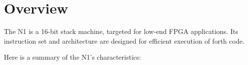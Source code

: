 
\section{Overview}
\label{overview}

The N1 is a 16-bit stack machine, targeted for low-end FPGA applications.
Its instruction set and architecture are designed for efficient execution
of \Gls{forth} code. 

\noindent
Here is a summary of the N1's characteristics:

